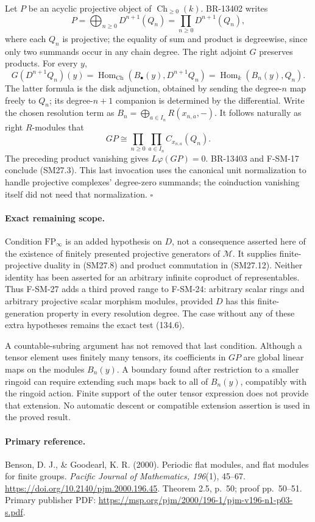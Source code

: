 Let \(P\) be an acyclic projective object of
\(\operatorname{Ch}_{\ge0}(k)\).  BR-13402 writes
\[
 P=\bigoplus_{n\ge0}D^{n+1}(Q_n)
   =\prod_{n\ge0}D^{n+1}(Q_n),
 \tag{SM27.13}
\]
where each \(Q_n\) is projective; the equality of sum and product is
degreewise, since only two summands occur in any chain degree.
The right adjoint \(G\) preserves products.  For every \(y\),
\[
 G(D^{n+1}Q_n)(y)
   =\operatorname{Hom}_{\mathrm{Ch}}(B_\bullet(y),D^{n+1}Q_n)
   =\operatorname{Hom}_k(B_n(y),Q_n).
\]
The latter formula is the disk adjunction, obtained by sending the
degree-\(n\) map freely to \(Q_n\); its degree-\(n+1\) companion is
determined by the differential.  Write the chosen resolution term as
\(B_n=\bigoplus_{a\in I_n}R(x_{n,a},-)\).
It follows naturally as right \(R\)-modules that
\[
 GP\cong\prod_{n\ge0}\prod_{a\in I_n}C_{x_{n,a}}(Q_n).
 \tag{SM27.14}
\]
The preceding product vanishing gives \(L\varphi(GP)=0\).
BR-13403 and F-SM-17 conclude (SM27.3).  This last invocation uses
the canonical unit normalization to handle projective complexes'
degree-zero summands; the coinduction vanishing itself did not need
that normalization. \(\square\)

\paragraph{Exact remaining scope.}
Condition \(\mathrm{FP}_\infty\) is an added hypothesis on \(D\),
not a consequence asserted here of the existence of finitely
presented projective generators of \(\mathcal M\).
It supplies finite-projective duality in (SM27.8) and product
commutation in (SM27.12).  Neither identity has been asserted for an
arbitrary infinite coproduct of representables.
Thus F-SM-27 adds a third proved range to F-SM-24:
arbitrary scalar rings and arbitrary projective scalar morphism
modules, provided \(D\) has this finite-generation property in every
resolution degree.  The case without any of these extra hypotheses
remains the exact test (134.6).

A countable-subring argument has not removed that last condition.
Although a tensor element uses finitely many tensors, its coefficients
in \(GP\) are global linear maps on the modules \(B_n(y)\).
A boundary found after restriction to a smaller ringoid can require
extending such maps back to all of \(B_n(y)\), compatibly with the
ringoid action.  Finite support of the outer tensor expression does
not provide that extension.  No automatic descent or compatible
extension assertion is used in the proved result.

\paragraph{Primary reference.}
Benson, D. J., \& Goodearl, K. R. (2000).
Periodic flat modules, and flat modules for finite groups.
\emph{Pacific Journal of Mathematics, 196}(1), 45--67.
\url{https://doi.org/10.2140/pjm.2000.196.45}.
Theorem 2.5, p.~50; proof pp.~50--51.
Primary publisher PDF:
\url{https://msp.org/pjm/2000/196-1/pjm-v196-n1-p03-s.pdf}.

